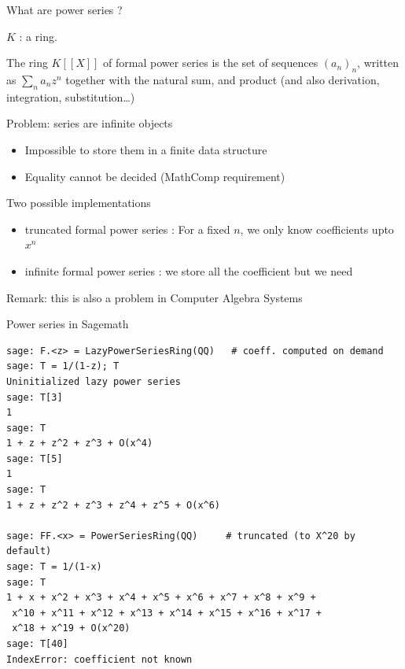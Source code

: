 \documentclass[compress,11pt]{beamer}
\renewcommand{\emph}[1]{{\color{red} #1}}
\begin{document}
\begin{frame}{What are power series ?}

  $K$ : a ring.
  \bigskip

  \begin{definition}
    The ring $K[[X]]$ of \emph{formal power series} is the set of sequences
    $(a_n)_n$, written as $\sum_n a_n z^n$ together with the natural sum, and
    product (and also derivation, integration, substitution\dots)
  \end{definition}
  \pause\bigskip

  Problem: series are infinite objects
  \begin{itemize}
  \item Impossible to store them in a finite data structure
    \medskip

  \item Equality cannot be decided (MathComp requirement)
  \end{itemize}
\end{frame}

\begin{frame}{Two possible implementations}

  \begin{NOTE}
    \begin{itemize}
    \item \emph{truncated formal power series} : For a fixed $n$, we only
      know coefficients upto $x^n$ \bigskip

    \item infinite \emph{formal power series} : we store all the coefficient
      but we need 
    \end{itemize}
  \end{NOTE}
  \bigskip

  Remark: this is also a problem in Computer Algebra Systems
\end{frame}


\begin{frame}[fragile]{Power series in Sagemath}

  \scriptsize
  \begin{verbatim}
sage: F.<z> = LazyPowerSeriesRing(QQ)   # coeff. computed on demand
sage: T = 1/(1-z); T
Uninitialized lazy power series
sage: T[3]
1
sage: T
1 + z + z^2 + z^3 + O(x^4)
sage: T[5]
1
sage: T
1 + z + z^2 + z^3 + z^4 + z^5 + O(x^6)

sage: FF.<x> = PowerSeriesRing(QQ)     # truncated (to X^20 by default)
sage: T = 1/(1-x)
sage: T
1 + x + x^2 + x^3 + x^4 + x^5 + x^6 + x^7 + x^8 + x^9 +
 x^10 + x^11 + x^12 + x^13 + x^14 + x^15 + x^16 + x^17 +
 x^18 + x^19 + O(x^20)
sage: T[40]
IndexError: coefficient not known
  \end{verbatim}
\end{frame}
\end{document}
